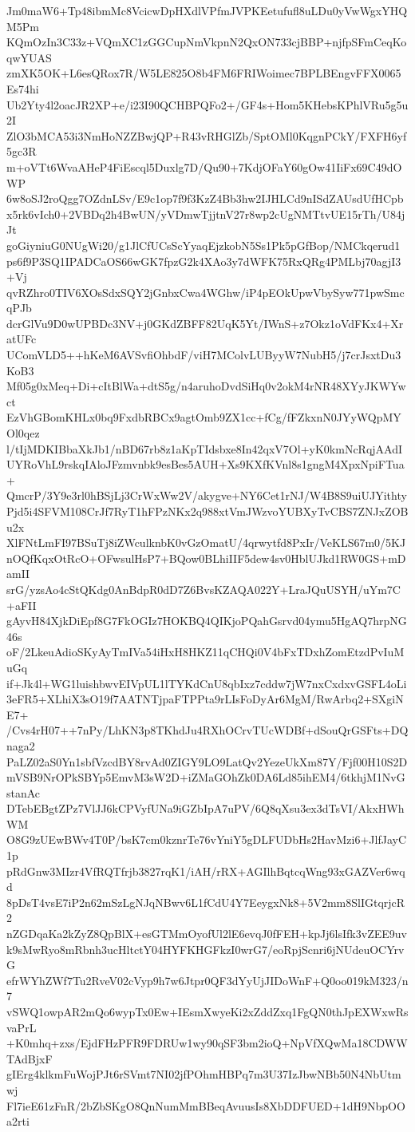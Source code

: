 Jm0maW6+Tp48ibmMc8VcicwDpHXdlVPfmJVPKEetufufl8uLDu0yVwWgxYHQM5Pm
KQmOzIn3C33z+VQmXC1zGGCupNmVkpnN2QxON733cjBBP+njfpSFmCeqKoqwYUAS
zmXK5OK+L6esQRox7R/W5LE825O8b4FM6FRIWoimec7BPLBEngvFFX0065Es74hi
Ub2Yty4l2oacJR2XP+e/i23I90QCHBPQFo2+/GF4s+Hom5KHebsKPhlVRu5g5u2I
ZlO3bMCA53i3NmHoNZZBwjQP+R43vRHGlZb/SptOMl0KqgnPCkY/FXFH6yf5gc3R
m+oVTt6WvaAHeP4FiEscql5Duxlg7D/Qu90+7KdjOFaY60gOw41IiFx69C49dOWP
6w8oSJ2roQgg7OZdnLSv/E9c1op7f9f3KzZ4Bb3hw2IJHLCd9nISdZAUsdUfHCpb
x5rk6vIch0+2VBDq2h4BwUN/yVDmwTjjtnV27r8wp2cUgNMTtvUE15rTh/U84jJt
goGiyniuG0NUgWi20/g1JlCfUCsScYyaqEjzkobN5Ss1Pk5pGfBop/NMCkqerud1
ps6f9P3SQ1IPADCaOS66wGK7fpzG2k4XAo3y7dWFK75RxQRg4PMLbj70agjI3+Vj
qvRZhro0TIV6XOsSdxSQY2jGnbxCwa4WGhw/iP4pEOkUpwVbySyw771pwSmcqPJb
dcrGlVu9D0wUPBDc3NV+j0GKdZBFF82UqK5Yt/IWnS+z7Okz1oVdFKx4+XratUFc
UComVLD5++hKeM6AVSvfiOhbdF/viH7MColvLUByyW7NubH5/j7crJsxtDu3KoB3
Mf05g0xMeq+Di+cItBlWa+dtS5g/n4aruhoDvdSiHq0v2okM4rNR48XYyJKWYwct
EzVhGBomKHLx0bq9FxdbRBCx9agtOmb9ZX1cc+fCg/fFZkxnN0JYyWQpMYOl0qez
l/tIjMDKIBbaXkJb1/nBD67rb8z1aKpTIdsbxe8In42qxV7Ol+yK0kmNcRqjAAdI
UYRoVhL9rskqIAloJFzmvnbk9esBes5AUH+Xs9KXfKVnl8s1gngM4XpxNpiFTua+
QmcrP/3Y9e3rl0hBSjLj3CrWxWw2V/akygve+NY6Cet1rNJ/W4B8S9uiUJYithty
Pjd5i4SFVM108CrJf7RyT1hFPzNKx2q988xtVmJWzvoYUBXyTvCBS7ZNJxZOBu2x
XlFNtLmFI97BSuTj8iZWculknbK0vGzOmatU/4qrwytfd8PxIr/VeKLS67m0/5KJ
nOQfKqxOtRcO+OFwsulHsP7+BQow0BLhiIIF5dew4sv0HblUJkd1RW0GS+mDamII
srG/yzsAo4cStQKdg0AnBdpR0dD7Z6BvsKZAQA022Y+LraJQuUSYH/uYm7C+aFII
gAyvH84XjkDiEpf8G7FkOGIz7HOKBQ4QIKjoPQahGsrvd04ymu5HgAQ7hrpNG46s
oF/2LkeuAdioSKyAyTmIVa54iHxH8HKZ11qCHQi0V4bFxTDxhZomEtzdPvIuMuGq
if+Jk4l+WG1luishbwvEIVpUL1lTYKdCnU8qbIxz7cddw7jW7nxCxdxvGSFL4oLi
3eFR5+XLhiX3sO19f7AATNTjpaFTPPta9rLIsFoDyAr6MgM/RwArbq2+SXgiNE7+
/Cvs4rH07++7nPy/LhKN3p8TKhdJu4RXhOCrvTUcWDBf+dSouQrGSFts+DQnaga2
PaLZ02aS0Yn1sbfVzcdBY8rvAd0ZIGY9LO9LatQv2YezeUkXm87Y/Fjf00H10S2D
mVSB9NrOPkSBYp5EmvM3sW2D+iZMaGOhZk0DA6Ld85ihEM4/6tkhjM1NvGstanAc
DTebEBgtZPz7VlJJ6kCPVyfUNa9iGZbIpA7uPV/6Q8qXsu3ex3dTsVI/AkxHWhWM
O8G9zUEwBWv4T0P/bsK7cm0kznrTe76vYniY5gDLFUDbHs2HavMzi6+JlfJayC1p
pRdGnw3MIzr4VfRQTfrjb3827rqK1/iAH/rRX+AGIlhBqtcqWng93xGAZVer6wqd
8pDsT4vsE7iP2n62mSzLgNJqNBwv6L1fCdU4Y7EeygxNk8+5V2mm8SlIGtqrjcR2
nZGDqaKa2kZyZ8QpBlX+esGTMmOyofUl2lE6evqJ0fFEH+kpJj6lsIfk3vZEE9uv
k9sMwRyo8mRbnh3ucHltctY04HYFKHGFkzI0wrG7/eoRpjScnri6jNUdeuOCYrvG
efrWYhZWf7Tu2RveV02cVyp9h7w6Jtpr0QF3dYyUjJIDoWnF+Q0oo019kM323/n7
vSWQ1owpAR2mQo6wypTx0Ew+IEsmXwyeKi2xZddZxq1FgQN0thJpEXWxwRsvaPrL
+K0mhq+zxs/EjdFHzPFR9FDRUw1wy90qSF3bm2ioQ+NpVfXQwMa18CDWWTAdBjxF
gIErg4klkmFuWojPJt6rSVmt7NI02jfPOhmHBPq7m3U37IzJbwNBb50N4NbUtmwj
Fl7ieE61zFnR/2bZbSKgO8QnNumMmBBeqAvuusIs8XbDDFUED+1dH9NbpOOa2rti

